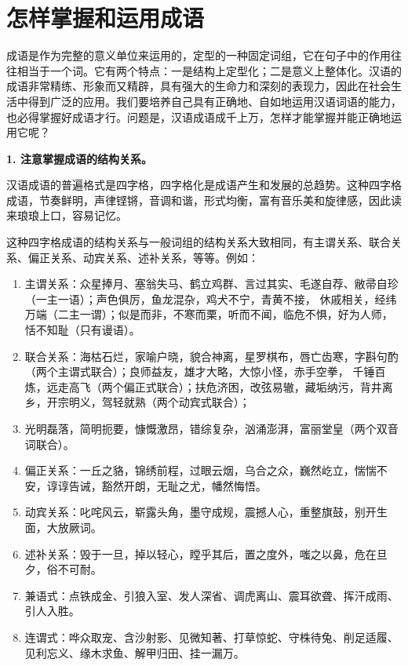 \section{怎样掌握和运用成语}

成语是作为完整的意义单位来运用的，定型的一种固定词组，它在句子中的作用往往相当于一个词。它有两个特点：一是结构上定型化；二是意义上整体化。汉语的成语非常精练、形象而又精辟，具有强大的生命力和深刻的表现力，因此在社会生活中得到广泛的应用。我们要培养自己具有正确地、自如地运用汉语词语的能力，也必得掌握好成语才行。问题是，汉语成语成千上万，怎样才能掌握并能正确地运用它呢？

\textbf{1. 注意掌握成语的结构关系。}

汉语成语的普遍格式是四字格，四字格化是成语产生和发展的总趋势。这种四字格成语，节奏鲜明，声律铿锵，音调和谐，形式均衡，富有音乐美和旋律感，因此读来琅琅上口，容易记忆。

这种四字格成语的结构关系与一般词组的结构关系大致相同，有主谓关系、联合关系、偏正关系、动宾关系、述补关系，等等。例如：

\begin{enumerate}
\item 主谓关系：众星捧月、塞翁失马、鹤立鸡群、言过其实、毛遂自荐、敝帚自珍（一主一语）；声色俱厉，鱼龙混杂，鸡犬不宁，青黄不接，
休戚相关，经纬万端（二主一谓）；似是而非，不寒而栗，听而不闻，临危不惧，好为人师，恬不知耻（只有谩语）。
\item 联合关系：海枯石烂，家喻户晓，貌合神离，星罗棋布，唇亡齿寒，字斟句酌（两个主谓式联合）；良师益友，雄才大略，大惊小怪，赤手空拳，
千锤百炼，远走高飞（两个偏正式联合）；扶危济困，改弦易辙，藏垢纳污，背井离乡，开宗明义，驾轻就熟（两个动宾式联合）；
\item 光明磊落，简明扼要，慷慨激昂，错综复杂，汹涌澎湃，富丽堂皇（两个双音词联合）。

\item 偏正关系：一丘之貉，锦绣前程，过眼云烟，乌合之众，巍然屹立，惴惴不安，谆谆告诫，豁然开朗，无耻之尤，幡然悔悟。

\item 动宾关系：叱咤风云，崭露头角，墨守成规，震撼人心，重整旗鼓，别开生面，大放厥词。

\item 述补关系：毁于一旦，掉以轻心，瞠乎其后，置之度外，嗤之以鼻，危在旦夕，俗不可耐。

\item 兼语式：点铁成金、引狼入室、发人深省、调虎离山、震耳欲聋、挥汗成雨、引人入胜。

\item 连谓式：哗众取宠、含沙射影、见微知著、打草惊蛇、守株待兔、削足适履、见利忘义、缘木求鱼、解甲归田、挂一漏万。
\end{enumerate}

